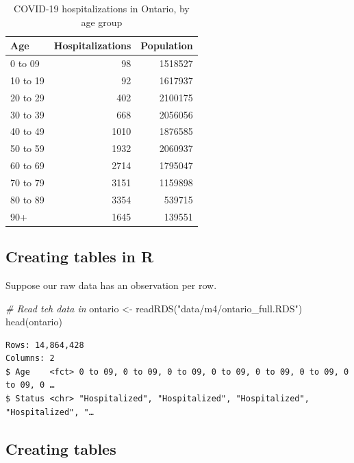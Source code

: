\documentclass[
  openany]{book}
\newenvironment{Shaded}{\begin{snugshade}}{\end{snugshade}}
\newcommand{\CommentTok}[1]{\textcolor[rgb]{0.56,0.35,0.01}{\textit{#1}}}
\newcommand{\FunctionTok}[1]{\textcolor[rgb]{0.00,0.00,0.00}{#1}}
\newcommand{\NormalTok}[1]{#1}
\newcommand{\OtherTok}[1]{\textcolor[rgb]{0.56,0.35,0.01}{#1}}
\newcommand{\StringTok}[1]{\textcolor[rgb]{0.31,0.60,0.02}{#1}}
\begin{document}
\begin{table}

\caption{\label{tab:unnamed-chunk-137}COVID-19 hospitalizations in Ontario, by age group}
\centering
\begin{tabular}[t]{l|r|r}
\hline
Age & Hospitalizations & Population\\
\hline
0 to 09 & 98 & 1518527\\
\hline
10 to 19 & 92 & 1617937\\
\hline
20 to 29 & 402 & 2100175\\
\hline
30 to 39 & 668 & 2056056\\
\hline
40 to 49 & 1010 & 1876585\\
\hline
50 to 59 & 1932 & 2060937\\
\hline
60 to 69 & 2714 & 1795047\\
\hline
70 to 79 & 3151 & 1159898\\
\hline
80 to 89 & 3354 & 539715\\
\hline
90+ & 1645 & 139551\\
\hline
\end{tabular}
\end{table}

\hypertarget{creating-tables-in-r}{%
\subsection{Creating tables in R}\label{creating-tables-in-r}}

Suppose our raw data has an observation per row.

\begin{Shaded}
\begin{Highlighting}[]
\CommentTok{\# Read teh data in}
\NormalTok{ontario }\OtherTok{\textless{}{-}} \FunctionTok{readRDS}\NormalTok{(}\StringTok{"data/m4/ontario\_full.RDS"}\NormalTok{)}
\FunctionTok{head}\NormalTok{(ontario)}
\end{Highlighting}
\end{Shaded}

\begin{verbatim}
Rows: 14,864,428
Columns: 2
$ Age    <fct> 0 to 09, 0 to 09, 0 to 09, 0 to 09, 0 to 09, 0 to 09, 0 to 09, 0 …
$ Status <chr> "Hospitalized", "Hospitalized", "Hospitalized", "Hospitalized", "…
\end{verbatim}

\hypertarget{creating-tables}{%
\subsection{Creating tables}\label{creating-tables}}
\end{document}
